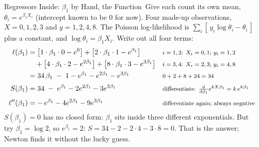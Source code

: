 \documentclass[aspectratio=169,11pt,xcolor=dvipsnames]{beamer}
\newcommand{\loglik}{\ell}
\newcommand{\core}{\,\raisebox{0.6pt}{\textcolor{corestar}{$\bigstar$}}}
\begin{document}
\begin{frame}{Regressors Inside: $\beta_1$ by Hand, the Function\core}
Give each count its own mean, $\theta_i = e^{\beta_1 X_i}$ (intercept known
to be $0$ for now). Four made-up observations, $X = 0, 1, 2, 3$ and
$y = 1, 2, 4, 8$. The Poisson log-likelihood is
$\sum_i [\, y_i \log\theta_i - \theta_i\,]$ plus a constant, and
$\log\theta_i = \beta_1 X_i$. Write out all four terms:
\begingroup\small\setlength{\abovedisplayskip}{2pt}\setlength{\belowdisplayskip}{2pt}
\begin{align*}
  \loglik(\beta_1)
  &= \big[1\cdot\beta_1\cdot 0 - e^{0}\big]
   + \big[2\cdot\beta_1\cdot 1 - e^{\beta_1}\big]
    && \text{\footnotesize $i = 1, 2$: $X_i = 0, 1$; $y_i = 1, 2$} \\
  &\quad + \big[4\cdot\beta_1\cdot 2 - e^{2\beta_1}\big]
   + \big[8\cdot\beta_1\cdot 3 - e^{3\beta_1}\big]
    && \text{\footnotesize $i = 3, 4$: $X_i = 2, 3$; $y_i = 4, 8$} \\
  &= 34\,\beta_1 \;-\; 1 - e^{\beta_1} - e^{2\beta_1} - e^{3\beta_1}
    && \text{\footnotesize $0 + 2 + 8 + 24 = 34$} \\[3pt]
  S(\beta_1) &= 34 \;-\; e^{\beta_1} - 2e^{2\beta_1} - 3e^{3\beta_1}
    && \text{\footnotesize differentiate: $\tfrac{d}{d\beta_1}e^{kX\beta_1} = k\,e^{k\beta_1}$} \\[3pt]
  \loglik''(\beta_1) &= -\,e^{\beta_1} - 4e^{2\beta_1} - 9e^{3\beta_1}
    && \text{\footnotesize differentiate again; always negative}
\end{align*}
\endgroup
\vskip2pt
$S(\beta_1) = 0$ has no closed form: $\beta_1$ sits inside three different
exponentials. But try $\beta_1 = \log 2$, so $e^{\beta_1} = 2$:
$S = 34 - 2 - 2\cdot 4 - 3\cdot 8 = 0$. That is the answer; Newton finds it
without the lucky guess.
\end{frame}
\end{document}
